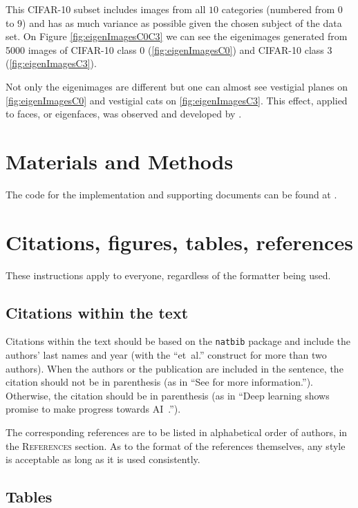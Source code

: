 \documentclass{article} %
\begin{document}
This CIFAR-10 subset includes images from all $10$ categories (numbered from $0$ to $9$) and has as much variance as possible given the chosen subject of the data set. On Figure \ref{fig:eigenImagesC0C3} we can see the eigenimages generated from 5000 images of CIFAR-10 class 0 (\ref{fig:eigenImagesC0}) and CIFAR-10 class 3 (\ref{fig:eigenImagesC3}).\par Not only the eigenimages are different but one can almost see vestigial planes on \ref{fig:eigenImagesC0} and vestigial cats on \ref{fig:eigenImagesC3}.
This effect, applied to faces, or eigenfaces, was observed and developed by \citet{sirovich1987low}.

\section{Materials and Methods}\label{materials}
The code for the implementation and supporting documents can be found at \citet{Stelling:aa}.

\section{Citations, figures, tables, references}
\label{others}

These instructions apply to everyone, regardless of the formatter being used.

\subsection{Citations within the text}


Citations within the text should be based on the \texttt{natbib} package
and include the authors' last names and year (with the ``et~al.'' construct
for more than two authors). When the authors or the publication are
included in the sentence, the citation should not be in parenthesis (as
in ``See \citet{Goodfellow:2016aa} for more information.''). Otherwise, the citation
should be in parenthesis (as in ``Deep learning shows promise to make progress towards AI~\citep{Goodfellow:2016aa}.'').

The corresponding references are to be listed in alphabetical order of
authors, in the \textsc{References} section. As to the format of the
references themselves, any style is acceptable as long as it is used
consistently.


\subsection{Tables}
\end{document}
